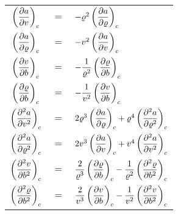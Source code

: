 {\setlength{\tabcolsep}{.2em}
\begin{tabularx}{\linewidth}{ccl}
\toprule
$\der{a}{v}{c}$ & $=$ & $-\varrho^2 \der{a}{\varrho}{c}$ \\[12pt]
$\der{a}{\varrho}{c}$ & $=$ & $-v^2 \der{a}{v}{c}$ \\
\midrule
$\der{v}{b}{c}$ & $=$ & $-\dfrac{1}{\varrho^2} \der{\varrho}{b}{c}$ \\[12pt]
$\der{\varrho}{b}{c}$ & $=$ & $-\dfrac{1}{v^2} \der{v}{b}{c}$ \\
\midrule[1pt]
$\der{^2 a}{v^2}{c}$ & $=$ & $2\varrho^3 \der{a}{\varrho}{c} + \varrho^4 \der{^2 a}{\varrho^2}{c}$ \\[12pt]
$\der{^2 a}{\varrho^2}{c}$ & $=$ & $2v^3 \der{a}{v}{c} + v^4 \der{^2 a}{v^2}{c}$ \\
\midrule
$\der{^2 v}{b^2}{c}$ & $=$ & $\dfrac{2}{\varrho^3} \der{\varrho}{b}{c} - \dfrac{1}{\varrho^2} \der{^2 \varrho}{b^2}{c}$ \\[12pt]
$\der{^2 \varrho}{b^2}{c}$ & $=$ & $\dfrac{2}{v^3} \der{v}{b}{c} - \dfrac{1}{v^2} \der{^2 v}{b^2}{c}$ \\
\bottomrule
\end{tabularx}%
}